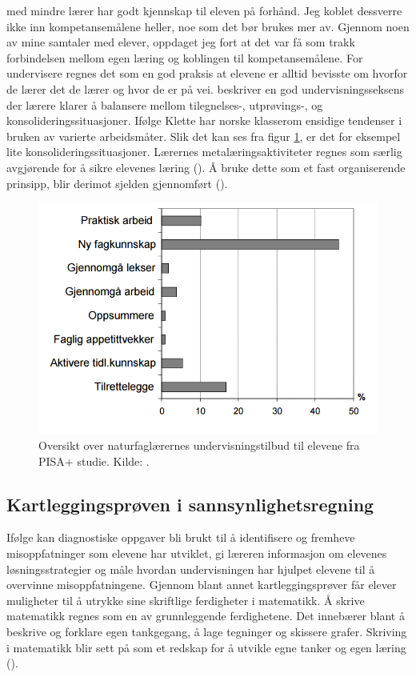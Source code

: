 \documentclass[main.tex]{subfiles}
\begin{document}
med mindre lærer har godt kjennskap til eleven på forhånd. Jeg koblet dessverre ikke inn kompetansemålene heller, 
noe som det bør brukes mer av. Gjennom noen av mine samtaler med elever, oppdaget jeg fort at det var få som trakk 
forbindelsen mellom egen læring og koblingen til kompetansemålene. For undervisere regnes det som en god praksis at 
elevene er alltid bevisste om hvorfor de lærer det de lærer og hvor de er på vei.  beskriver 
en god undervisningsseksens der lærere klarer å balansere mellom tilegnelses-, utprøvings-, og 
konsolideringssituasjoner. Ifølge Klette har norske klasserom ensidige tendenser i bruken av varierte arbeidsmåter. 
Slik det kan ses fra figur \ref{fig:odeg10}, er det for eksempel lite konsolideringssituasjoner. Lærernes 
metalæringsaktiviteter regnes som særlig avgjørende for å sikre elevenes læring (). Å bruke 
dette som et fast organiserende prinsipp, blir derimot sjelden gjennomført ().
\begin{figure}[h!]
\includegraphics[scale = 0.6]{../figures/undervisnings_aktivitet.png}
\caption{Oversikt over naturfaglærernes undervisningstilbud til elevene fra PISA+ studie. Kilde: 
\protect{}.}
\label{fig:odeg10}
\end{figure}

\subsection*{Kartleggingsprøven i sannsynlighetsregning}

Ifølge  kan diagnostiske oppgaver bli brukt til å identifisere og fremheve misoppfatninger 
som elevene har utviklet, gi læreren informasjon om elevenes løsningsstrategier og måle hvordan undervisningen 
har hjulpet elevene til å overvinne misoppfatningene. Gjennom blant annet kartleggingsprøver får elever muligheter
til å utrykke sine skriftlige ferdigheter i matematikk. Å skrive matematikk regnes som en av grunnleggende 
ferdighetene. Det innebærer blant å beskrive og forklare egen tankgegang, å lage tegninger og skissere grafer. 
Skriving i matematikk blir sett på som et redskap for å utvikle egne tanker og egen læring (). 
\end{document}
